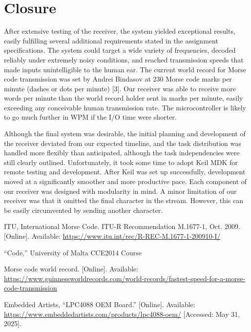 \documentclass[head=13.6pt]{cce2014-design}
\begin{document}
\section{Closure}
After extensive testing of the receiver, the system yielded exceptional results, easily fulfilling several additional requirements stated in the assignment specifications. The system could target a wide variety of frequencies, decoded reliably under extremely noisy conditions, and reached transmission speeds that made inputs unintelligible to the human ear. The current world record for Morse code transmission was set by Andrei Bindasov at 230 Morse code marks per minute (dashes or dots per minute) [3]. Our receiver was able to receive more words per minute than the world record holder sent in marks per minute, easily exceeding any conceivable human transmission rate. The microcontroller is likely to go much further in WPM if the I/O time were shorter.

Although the final system was desirable, the initial planning and development of the receiver deviated from our expected timeline, and the task distribution was handled more flexibly than anticipated, although the task independencies were still clearly outlined. Unfortunately, it took some time to adopt Keil MDK for remote testing and development. After Keil was set up successfully, development moved at a significantly smoother and more productive pace. Each component of our receiver was designed with modularity in mind. A minor limitation of our receiver was that it omitted the final character in the stream. However, this can be easily circumvented by sending another character.

\nocite{itu}

\begin{thebibliography}{9}

ITU, International Morse Code. ITU-R Recommendation M.1677-1, Oct. 2009. [Online]. Available: \url{https://www.itu.int/rec/R-REC-M.1677-1-200910-I/}

“Code,” University of Malta CCE2014 Course

Morse code world record. [Online]. Available: \url{https://www.guinnessworldrecords.com/world-records/fastest-speed-for-a-morse-code-transmission}

Embedded Artists, “LPC4088 OEM Board.” [Online]. Available: \url{https://www.embeddedartists.com/products/lpc4088-oem/} [Accessed: May 31, 2025].

\end{thebibliography}
\end{document}
